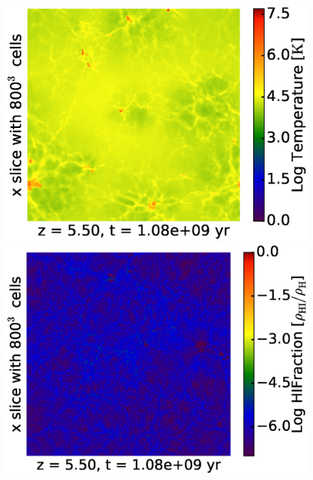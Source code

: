 \begin{figure}[!tp]
\begin{minipage}[h]{0.33\linewidth}
	\includegraphics[trim = 10mm 0mm 7mm 7mm, clip, width=1.0\textwidth]{4_2_slice_Temperature_x_HD20125.eps}
	\end{minipage}
\hspace*{-2.00mm}
	\begin{minipage}[h]{0.33\linewidth}
	\centering
	\includegraphics[trim = 10mm 0mm 7mm 7mm, clip, width=1.0\textwidth]{4_3_slice_HIFraction_x_HD20125.eps}
	\end{minipage}
\vspace*{-2.00mm}\\
	\begin{minipage}[h]{0.33\linewidth}
	\centering

\end{minipage}
\end{figure}
